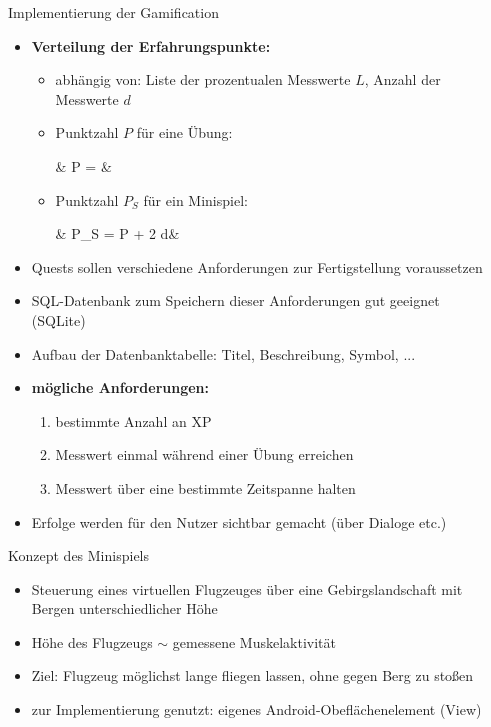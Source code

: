 \documentclass[final,20pt]{beamer}
\newlength{\sepwidth}
\newlength{\colwidth}
\newcommand{\separatorcolumn}{\begin{column}{\sepwidth}\end{column}}
\begin{document}
\begin{frame}[t]
\begin{columns}[t]
\begin{column}{\colwidth}
	\begin{alertblock}{Implementierung der Gamification}
		\begin{itemize}
			\item \textbf{Verteilung der Erfahrungspunkte:}
			\begin{itemize}
				\item abhängig von: Liste der prozentualen Messwerte $L$, Anzahl der Messwerte $d$
				\item Punktzahl $P$ für eine Übung:
				\begin{flalign*}
				& P = &
				\end{flalign*}
				\item Punktzahl $P_{S}$ für ein Minispiel:
				\begin{flalign*}
				& P_{S} = P + 2 \cdot d&
				\end{flalign*}
			\end{itemize}
			\item Quests sollen verschiedene Anforderungen zur Fertigstellung voraussetzen
			\item SQL-Datenbank zum Speichern dieser Anforderungen gut geeignet (SQLite)
			\item Aufbau der Datenbanktabelle: Titel, Beschreibung, Symbol, ...
			\item \textbf{mögliche Anforderungen:}
			\begin{enumerate}
				\item bestimmte Anzahl an XP
				\item Messwert einmal während einer Übung erreichen
				\item Messwert über eine bestimmte Zeitspanne halten
			\end{enumerate}
			\item Erfolge werden für den Nutzer sichtbar gemacht (über Dialoge etc.)
		\end{itemize}
	\end{alertblock}

	\begin{alertblock}{Konzept des Minispiels}
		\begin{itemize}
			\item Steuerung eines virtuellen Flugzeuges über eine Gebirgslandschaft mit Bergen unterschiedlicher Höhe
			\item Höhe des Flugzeugs $\sim$ gemessene Muskelaktivität
			\item Ziel: Flugzeug möglichst lange fliegen lassen, ohne gegen Berg zu stoßen
			\item zur Implementierung genutzt: eigenes Android-Obeflächenelement (View)
		\end{itemize}
	\end{alertblock}

\end{column}

\separatorcolumn
\end{columns}
\end{frame}
\end{document}
